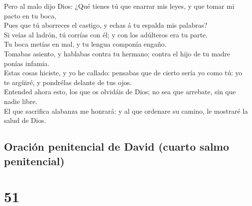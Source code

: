  Pero al malo dijo Dios: ¿Qué tienes tú que enarrar mis
leyes, y que tomar mi pacto en tu boca,\\
 Pues que tú aborreces el castigo, y echas á tu espalda
mis palabras?\\
 Si veías al ladrón, tú corrías con él; y con los
adúlteros era tu parte.\\
 Tu boca metías en mal, y tu lengua componía engaño.\\
 Tomabas asiento, y hablabas contra tu hermano; contra el
hijo de tu madre ponías infamia.\\
 Estas cosas hiciste, y yo he callado: pensabas que de
cierto sería yo como tú: yo te argüiré, y pondrélas delante de tus
ojos.\\
 Entended ahora esto, los que os olvidáis de Dios; no sea
que arrebate, sin que nadie libre.\\
 El que sacrifica alabanza me honrará: y al que ordenare
su camino, le mostraré la salud de Dios.

\hypertarget{oraciuxf3n-penitencial-de-david-cuarto-salmo-penitencial}{%
\subsection{Oración penitencial de David (cuarto salmo
penitencial)}\label{oraciuxf3n-penitencial-de-david-cuarto-salmo-penitencial}}

\hypertarget{section-19-51}{%
\section{51}\label{section-19-51}}

